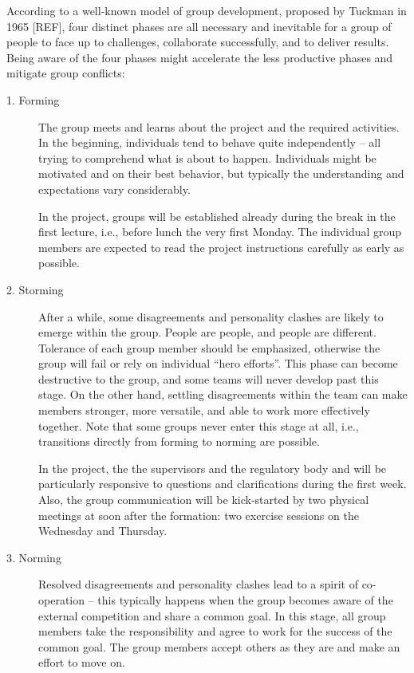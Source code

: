\documentclass{scrreprt}
\begin{document}
According to a well-known model of group development, proposed by Tuckman in 1965 [REF], four distinct phases are all necessary and inevitable for a group of people to face up to challenges, collaborate successfully, and to  deliver results. Being aware of the four phases might accelerate the less productive phases and mitigate group conflicts:
\begin{description}
\item[1. Forming] The group meets and learns about the project and the required activities. In the beginning, individuals tend to behave quite independently -- all trying to comprehend what is about to happen. Individuals might be motivated and on their best behavior, but typically the understanding and expectations vary considerably. 

In the project, groups will be established already during the break in the first lecture, i.e., before lunch the very first Monday. The individual group members are expected to read the project instructions carefully as early as possible.
\item[2. Storming] After a while, some disagreements and personality clashes are likely to emerge within the group. People are people, and people are different. Tolerance of each group member should be emphasized, otherwise the group will fail or rely on individual ``hero efforts''. This phase can become destructive to the group, and some teams will never develop past this stage. On the other hand, settling disagreements within the team can make members stronger, more versatile, and able to work more effectively together. Note that some groups never enter this stage at all, i.e., transitions directly from forming to norming are possible.

In the project, the the supervisors and the regulatory body and will be particularly responsive to questions and clarifications during the first week. Also, the group communication will be kick-started by two physical meetings at soon after the formation: two exercise sessions on the Wednesday and Thursday.

\item[3. Norming] Resolved disagreements and personality clashes lead to a spirit of co-operation -- this typically happens when the group becomes aware of the external competition and share a common goal. In this stage, all group members take the responsibility and agree to work for the success of the common goal. The group members accept others as they are and make an effort to move on. 


\end{description}
\end{document}
